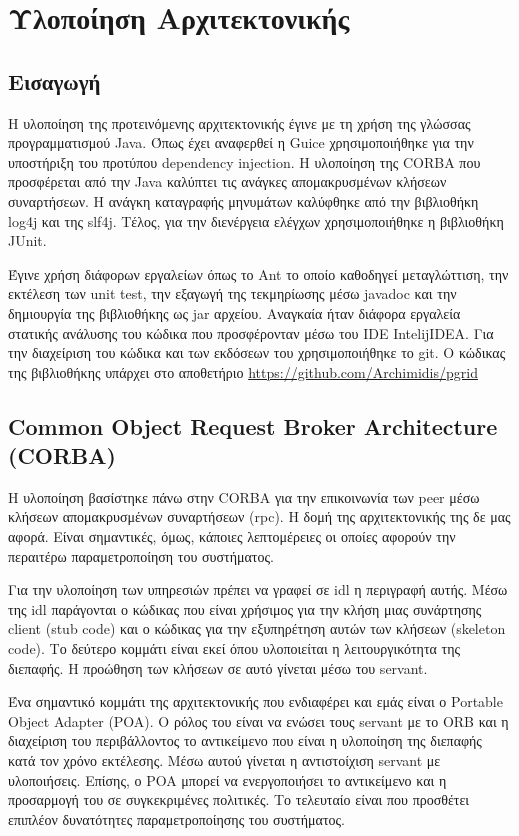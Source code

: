 \chapter{Υλοποίηση Αρχιτεκτονικής}
\label{chap:Impl}

\section{Εισαγωγή}

Η υλοποίηση της προτεινόμενης αρχιτεκτονικής έγινε με τη χρήση 
της γλώσσας προγραμματισμού Java. Όπως έχει αναφερθεί η Guice 
χρησιμοποιήθηκε για την υποστήριξη του προτύπου dependency injection. Η 
υλοποίηση της CORBA που προσφέρεται από την Java καλύπτει τις ανάγκες 
απομακρυσμένων κλήσεων συναρτήσεων. Η ανάγκη καταγραφής μηνυμάτων 
καλύφθηκε από την βιβλιοθήκη log4j και της slf4j. Τέλος, για την 
διενέργεια ελέγχων χρησιμοποιήθηκε η βιβλιοθήκη JUnit.

Έγινε χρήση διάφορων εργαλείων όπως το Ant το οποίο καθοδηγεί 
μεταγλώττιση, την εκτέλεση των unit test, την εξαγωγή της τεκμηρίωσης 
μέσω javadoc και την δημιουργία της βιβλιοθήκης ως jar αρχείου. Αναγκαία 
ήταν διάφορα εργαλεία στατικής ανάλυσης του κώδικα που προσφέρονταν μέσω 
του IDE IntelijIDEA. Για την διαχείριση του κώδικα και των εκδόσεων του 
χρησιμοποιήθηκε το git. Ο κώδικας της βιβλιοθήκης υπάρχει στο αποθετήριο 
\url{https://github.com/Archimidis/pgrid}

\section{Common Object Request Broker Architecture (CORBA)}

Η υλοποίηση βασίστηκε πάνω στην CORBA 
\citep{CorbaSpec, CorbaSpecP1, CorbaSpecP2, CorbaSpecP3} για 
την επικοινωνία των peer μέσω κλήσεων απομακρυσμένων συναρτήσεων (rpc). 
Η δομή της αρχιτεκτονικής της δε μας αφορά. Είναι σημαντικές, όμως, 
κάποιες λεπτομέρειες οι οποίες αφορούν την περαιτέρω παραμετροποίηση του 
συστήματος. 

Για την υλοποίηση των υπηρεσιών πρέπει να γραφεί σε idl η περιγραφή 
αυτής. Μέσω της idl παράγονται ο κώδικας που είναι χρήσιμος για την 
κλήση μιας συνάρτησης client (stub code) και ο κώδικας για την 
εξυπηρέτηση αυτών των κλήσεων (skeleton code). Το δεύτερο κομμάτι είναι 
εκεί όπου υλοποιείται η λειτουργικότητα της διεπαφής. Η προώθηση των 
κλήσεων σε αυτό γίνεται μέσω του servant.

Ένα σημαντικό κομμάτι της αρχιτεκτονικής που ενδιαφέρει και εμάς είναι ο 
Portable Object Adapter (POA). Ο ρόλος του είναι να ενώσει τους servant 
με το ORB και η διαχείριση του περιβάλλοντος το αντικείμενο που είναι η 
υλοποίηση της διεπαφής κατά τον χρόνο εκτέλεσης. Μέσω αυτού γίνεται η 
αντιστοίχιση servant με υλοποιήσεις. Επίσης, ο POA μπορεί να 
ενεργοποιήσει το αντικείμενο και η προσαρμογή του σε συγκεκριμένες 
πολιτικές. Το τελευταίο είναι που προσθέτει επιπλέον δυνατότητες 
παραμετροποίησης του συστήματος.

